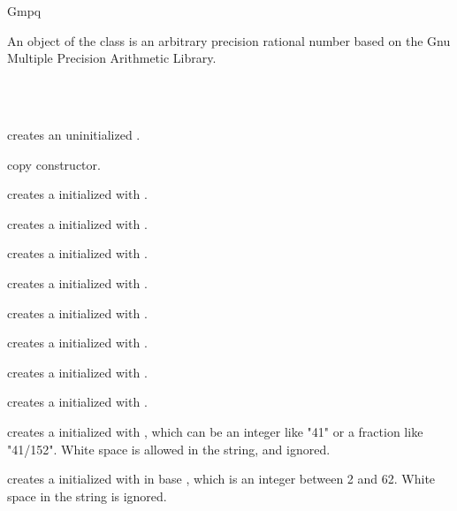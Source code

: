 \begin{ccRefClass} {Gmpq}
\label{Gmpq}

\ccDefinition

An object of the class  is an arbitrary precision rational
number based on the {\sc Gnu} Multiple Precision Arithmetic Library. 


\ccIsModel
{}\\
\\

\ccCreation
{}

             {creates an uninitialized  \ccVar.}

\ccHidden {}
            {copy constructor.}

            {creates a  initialized with
             .}

            {creates a  initialized with
             .}

            {creates a  initialized with
             .}

            {creates a  initialized with
             .}

            {creates a  initialized with
             .}

            {creates a  initialized with
             .}

            {creates a  initialized with
             .}

            {creates a  initialized with
             .}

            {creates a  initialized with , which can
	    be an integer like "41" or a fraction like "41/152". White
	    space is allowed in the string, and ignored.}

            {creates a  initialized with  in base
	    , which is an integer between 2 and 62. White space
	    in the string is ignored.}


\end{ccRefClass}
